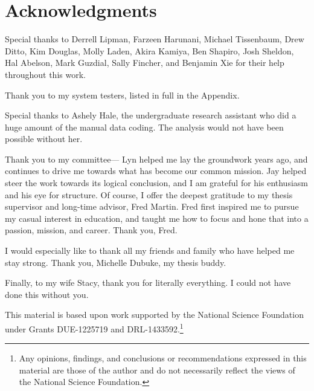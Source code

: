 \chapter*{Acknowledgments}
\renewcommand{\thefootnote}{\fnsymbol{footnote}}


Special thanks to Derrell Lipman, Farzeen Harunani, Michael Tissenbaum, Drew Ditto, Kim Douglas, Molly Laden, Akira Kamiya, Ben Shapiro, Josh Sheldon, Hal Abelson, Mark Guzdial, Sally Fincher, and Benjamin Xie for their help throughout this work.

Thank you to my system testers, listed in full in the Appendix.


Special thanks to Ashely Hale, the undergraduate research assistant who did a huge amount of the manual data coding. The analysis would not have been possible without her.

Thank you to my committee--- Lyn helped me lay the groundwork years ago, and continues to drive me towards what has become our common mission. Jay helped steer the work towards its logical conclusion, and I am grateful for his enthusiasm and his eye for structure. Of course, I offer the deepest gratitude to my thesis supervisor and long-time advisor, Fred Martin. Fred first inspired me to pursue my casual interest in education, and taught me how to focus and hone that into a passion, mission, and career. Thank you, Fred. 

I would especially like to thank all my friends and family who have helped me stay strong. Thank you, Michelle Dubuke, my thesis buddy.

Finally, to my wife Stacy, thank you for literally everything. I could not have done this without you.


This material is based upon work supported by the National Science Foundation under Grants DUE-1225719 and DRL-1433592.\footnote{Any opinions, findings, and conclusions or recommendations expressed in this material are those of the author and do not necessarily reflect the views of the National Science Foundation.}

\renewcommand{\thefootnote}{\arabic{footnote}}